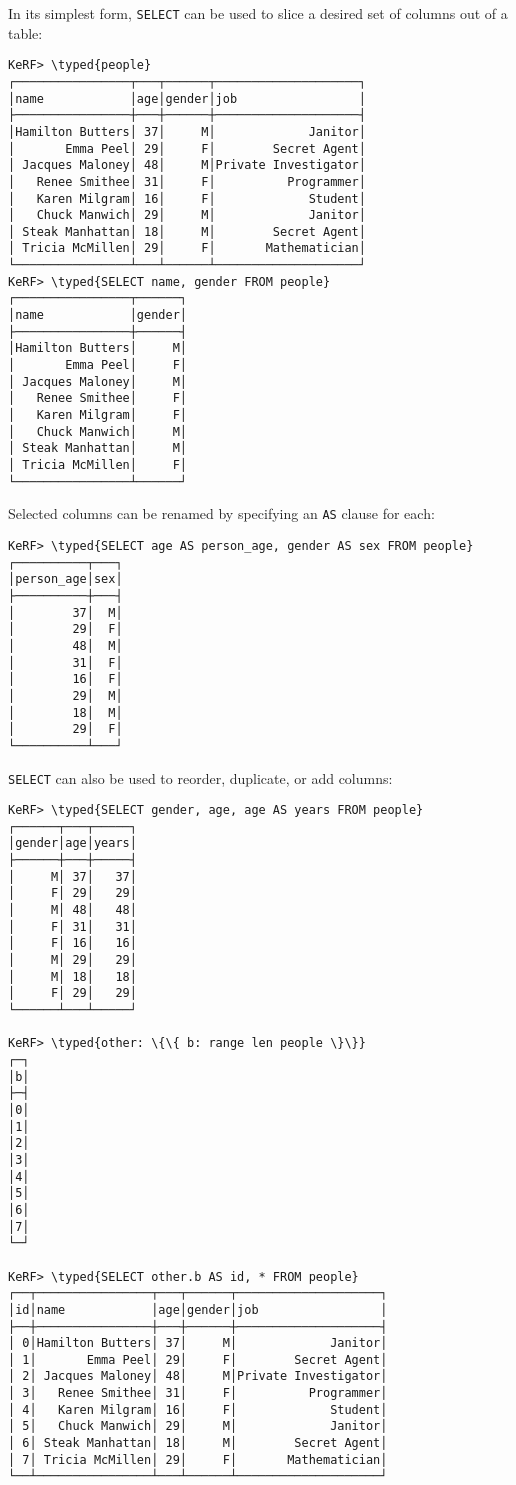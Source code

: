 \documentclass{article}
\newcommand{\typed}[1]{\textcolor{TealBlue}{#1}}
\begin{document}
In its simplest form, \texttt{SELECT} can be used to slice a desired set of columns out of a table:
\begin{Verbatim}
KeRF> \typed{people}
┌────────────────┬───┬──────┬────────────────────┐
│name            │age│gender│job                 │
├────────────────┼───┼──────┼────────────────────┤
│Hamilton Butters│ 37│     M│             Janitor│
│       Emma Peel│ 29│     F│        Secret Agent│
│ Jacques Maloney│ 48│     M│Private Investigator│
│   Renee Smithee│ 31│     F│          Programmer│
│   Karen Milgram│ 16│     F│             Student│
│   Chuck Manwich│ 29│     M│             Janitor│
│ Steak Manhattan│ 18│     M│        Secret Agent│
│ Tricia McMillen│ 29│     F│       Mathematician│
└────────────────┴───┴──────┴────────────────────┘
KeRF> \typed{SELECT name, gender FROM people}
┌────────────────┬──────┐
│name            │gender│
├────────────────┼──────┤
│Hamilton Butters│     M│
│       Emma Peel│     F│
│ Jacques Maloney│     M│
│   Renee Smithee│     F│
│   Karen Milgram│     F│
│   Chuck Manwich│     M│
│ Steak Manhattan│     M│
│ Tricia McMillen│     F│
└────────────────┴──────┘
\end{Verbatim}

Selected columns can be renamed by specifying an \texttt{AS} clause for each:
\begin{Verbatim}
KeRF> \typed{SELECT age AS person_age, gender AS sex FROM people}
┌──────────┬───┐
│person_age│sex│
├──────────┼───┤
│        37│  M│
│        29│  F│
│        48│  M│
│        31│  F│
│        16│  F│
│        29│  M│
│        18│  M│
│        29│  F│
└──────────┴───┘
\end{Verbatim}

\pagebreak
\texttt{SELECT} can also be used to reorder, duplicate, or add columns:
\begin{Verbatim}
KeRF> \typed{SELECT gender, age, age AS years FROM people}
┌──────┬───┬─────┐
│gender│age│years│
├──────┼───┼─────┤
│     M│ 37│   37│
│     F│ 29│   29│
│     M│ 48│   48│
│     F│ 31│   31│
│     F│ 16│   16│
│     M│ 29│   29│
│     M│ 18│   18│
│     F│ 29│   29│
└──────┴───┴─────┘

KeRF> \typed{other: \{\{ b: range len people \}\}}
┌─┐
│b│
├─┤
│0│
│1│
│2│
│3│
│4│
│5│
│6│
│7│
└─┘

KeRF> \typed{SELECT other.b AS id, * FROM people}
┌──┬────────────────┬───┬──────┬────────────────────┐
│id│name            │age│gender│job                 │
├──┼────────────────┼───┼──────┼────────────────────┤
│ 0│Hamilton Butters│ 37│     M│             Janitor│
│ 1│       Emma Peel│ 29│     F│        Secret Agent│
│ 2│ Jacques Maloney│ 48│     M│Private Investigator│
│ 3│   Renee Smithee│ 31│     F│          Programmer│
│ 4│   Karen Milgram│ 16│     F│             Student│
│ 5│   Chuck Manwich│ 29│     M│             Janitor│
│ 6│ Steak Manhattan│ 18│     M│        Secret Agent│
│ 7│ Tricia McMillen│ 29│     F│       Mathematician│
└──┴────────────────┴───┴──────┴────────────────────┘
\end{Verbatim}
\end{document}
